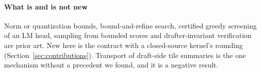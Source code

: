 \paragraph{What is and is not new} Norm or quantization bounds, bound-and-refine search, certified greedy screening of an LM head, sampling from bounded scores and drafter-invariant verification are prior art. New here is the contract with a closed-source kernel's rounding (Section~\ref{sec:contributions}). Transport of draft-side tile summaries is the one mechanism without a precedent we found, and it is a negative result.
